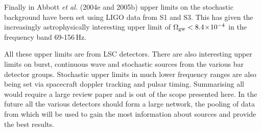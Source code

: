 Finally in Abbott {\it et al.} (2004e and 2005b) \cite{Abbott5:2004, Abbott2:2005} upper limits on
the stochastic background have been set using LIGO data from S1 and S3. This has given the
increasingly astrophysically interesting upper limit of $\Omega_{\rm gw} < 8.4\!\times\!10^{-4}$ in the
frequency band 69-156\,Hz.

All these upper limits are from LSC detectors. There are also interesting upper limits on burst,
continuous wave and stochastic sources from the various bar detector groups. Stochastic upper limits
in much lower frequency ranges are also being set via spacecraft doppler tracking and pulsar timing.
Summarising all would require a large review paper and is out of the scope presented here. In the
future all the various detectors should form a large network, the pooling of data from which will be
used to gain the most information about sources and provide the best results.